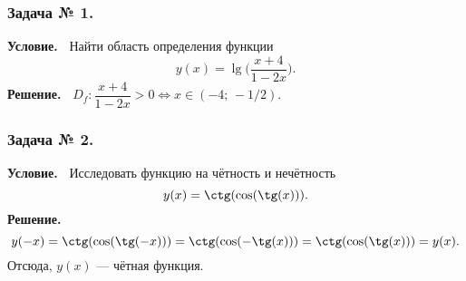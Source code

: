 \subsubsection*{\center Задача № 1.}
{\bf Условие.~}
Найти область определения функции
$$
y(x) = \lg\biggl(\dfrac{x+4}{1-2x}\biggr).
$$	
{\bf Решение.~}	
$D_f: \dfrac{x+4}{1-2x}>0 \Leftrightarrow x \in (-4;\,-1/2).$

\subsubsection*{\center Задача № 2.}
{\bf Условие.~}
Исследовать функцию на чётность и нечётность
$$
y(x) = \ctg(\cos(\tg(x))).
$$	
{\bf Решение.~}	
$$
y(-x) = \ctg(\cos(\tg(-x))) = \ctg(\cos(-\tg(x))) = \ctg(\cos(\tg(x))) = y(x).
$$	
Отсюда, $y(x)$ --- чётная функция.


